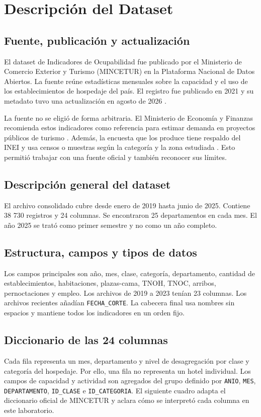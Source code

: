 \documentclass[10pt,a4paper]{article}
\theoremstyle{definition}
\begin{document}
\section{Descripción del Dataset}
\subsection{Fuente, publicación y actualización}
El dataset de Indicadores de Ocupabilidad fue publicado por el Ministerio de
Comercio Exterior y Turismo (MINCETUR) en la Plataforma Nacional de Datos
Abiertos. La fuente reúne estadísticas mensuales sobre la capacidad y el uso
de los establecimientos de hospedaje del país. El registro fue publicado en
2021 y su metadato tuvo una actualización en agosto de 2026
\cite{mincetur_ocupabilidad}.

La fuente no se eligió de forma arbitraria. El Ministerio de Economía y
Finanzas recomienda estos indicadores como referencia para estimar demanda en
proyectos públicos de turismo \cite{mef_ficha_tecnica_turismo2021}. Además, la
encuesta que los produce tiene respaldo del INEI y usa censos o muestras según
la categoría y la zona estudiada \cite{inei_rj037_2024}. Esto permitió trabajar
con una fuente oficial y también reconocer sus límites.

\subsection{Descripción general del dataset}
El archivo consolidado cubre desde enero de 2019 hasta junio de 2025. Contiene
38 730 registros y 24 columnas. Se encontraron 25 departamentos en cada mes.
El año 2025 se trató como primer semestre y no como un año completo.

\subsection{Estructura, campos y tipos de datos}
Los campos principales son año, mes, clase, categoría, departamento, cantidad
de establecimientos, habitaciones, plazas-cama, TNOH, TNOC, arribos,
pernoctaciones y empleo. Los archivos de 2019 a 2023 tenían 23 columnas. Los
archivos recientes añadían \texttt{FECHA\_CORTE}. La cabecera final usa nombres
sin espacios y mantiene todos los indicadores en un orden fijo.

\subsection{Diccionario de las 24 columnas}
Cada fila representa un mes, departamento y nivel de desagregación por clase y
categoría del hospedaje. Por ello, una fila no representa un hotel individual.
Los campos de capacidad y actividad son agregados del grupo definido por
\texttt{ANIO}, \texttt{MES}, \texttt{DEPARTAMENTO}, \texttt{ID\_CLASE} e
\texttt{ID\_CATEGORIA}. El siguiente cuadro adapta el diccionario oficial de
MINCETUR \cite{mincetur_ocupabilidad} y aclara cómo se interpretó cada columna
en este laboratorio.
\end{document}

